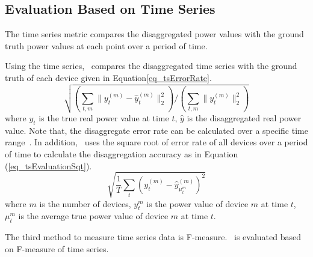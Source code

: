 \subsection{Evaluation Based on Time Series}
The time series metric compares the disaggregated power values with the ground 
truth power values at each point over a period of time.

Using the time series,~\cite{kolter2012aistat} compares the
disaggregated time series with the ground truth of each device given in
Equation\ref{eq_tsErrorRate}.
\begin{equation}
\label{eq_tsErrorRate}
\sqrt{(\sum_{t,m} \lVert y_t^{(m)}- \hat{y}_t^{(m)} \rVert_2^2)/(\sum_{t,m} \lVert y_t^{(m)}\rVert_2^2)}
\end{equation}
where $y_t$ is the true real power value at time $t$, 
$\hat{y}$ is the disaggregated real power value. 
Note that, the disaggregate error rate can be calculated over a
specific time range~\cite{kolter2012aistat}. 
In addition,~\cite{parson2012nonintrusive} uses the square root 
of error rate of all devices over a period of time to calculate 
the disaggregation accuracy as in Equation (\ref{eq_tsEvaluationSqt}). 
\begin{equation}
\label{eq_tsEvaluationSqt}
\sqrt{\frac{1}{T}\sum_t(y_t^{(m)}-\hat{y}_{\mu_t^m}^{(m)})^2}
\end{equation}
where $m$ is the number of devices, 
$y_t^m$ is the power value of device $m$ at time $t$,  
$\mu_t^m$ is the average true power value of device $m$ at time $t$. 


The third method to measure time series data is F-measure.~\cite{kim2011unsupervised} is 
evaluated based on F-measure of time series.


